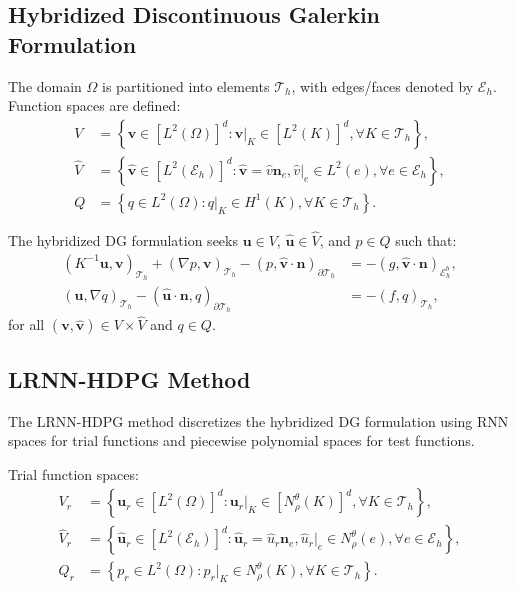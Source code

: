 \documentclass[11pt,a4paper]{article}
\begin{document}
\subsection{Hybridized Discontinuous Galerkin Formulation}

The domain $\Omega$ is partitioned into elements $\mathcal{T}_h$, with edges/faces denoted by $\mathcal{E}_h$. Function spaces are defined:
\begin{align}
V &= \left\{\mathbf{v} \in [L^2(\Omega)]^d : \mathbf{v}|_K \in [L^2(K)]^d, \forall K \in \mathcal{T}_h \right\}, \\
\hat{V} &= \left\{\hat{\mathbf{v}} \in [L^2(\mathcal{E}_h)]^d : \hat{\mathbf{v}} = \hat{v}\mathbf{n}_e, \hat{v}|_e \in L^2(e), \forall e \in \mathcal{E}_h \right\}, \\
Q &= \left\{q \in L^2(\Omega) : q|_K \in H^1(K), \forall K \in \mathcal{T}_h \right\}.
\end{align}

The hybridized DG formulation seeks $\mathbf{u} \in V$, $\hat{\mathbf{u}} \in \hat{V}$, and $p \in Q$ such that:
\begin{align}
(K^{-1}\mathbf{u}, \mathbf{v})_{\mathcal{T}_h} + (\nabla p, \mathbf{v})_{\mathcal{T}_h} - (p, \hat{\mathbf{v}} \cdot \mathbf{n})_{\partial\mathcal{T}_h} &= -(g, \hat{\mathbf{v}} \cdot \mathbf{n})_{\mathcal{E}_h^b}, \\
(\mathbf{u}, \nabla q)_{\mathcal{T}_h} - (\hat{\mathbf{u}} \cdot \mathbf{n}, q)_{\partial\mathcal{T}_h} &= -(f, q)_{\mathcal{T}_h},
\end{align}
for all $(\mathbf{v}, \hat{\mathbf{v}}) \in V \times \hat{V}$ and $q \in Q$.

\subsection{LRNN-HDPG Method}

The LRNN-HDPG method discretizes the hybridized DG formulation using RNN spaces for trial functions and piecewise polynomial spaces for test functions.

Trial function spaces:
\begin{align}
V_r &= \left\{\mathbf{u}_r \in [L^2(\Omega)]^d : \mathbf{u}_r|_K \in [N^\theta_\rho(K)]^d, \forall K \in \mathcal{T}_h \right\}, \\
\hat{V}_r &= \left\{\hat{\mathbf{u}}_r \in [L^2(\mathcal{E}_h)]^d : \hat{\mathbf{u}}_r = \hat{u}_r\mathbf{n}_e, \hat{u}_r|_e \in N^\theta_\rho(e), \forall e \in \mathcal{E}_h \right\}, \\
Q_r &= \left\{p_r \in L^2(\Omega) : p_r|_K \in N^\theta_\rho(K), \forall K \in \mathcal{T}_h \right\}.
\end{align}
\end{document}
